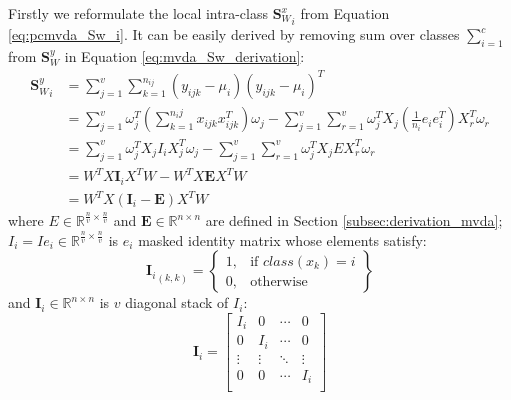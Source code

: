 \begin{appendix}
    Firstly we reformulate the local intra-class ${\boldsymbol{S}^x_W}_{i}$ from Equation \eqref{eq:pcmvda_Sw_i}.
    It can be easily derived by removing sum over classes $\sum_{i=1}^{c}$ from $\boldsymbol{S}_W^y$ in Equation \eqref{eq:mvda_Sw_derivation}:
    \begin{equation}
        \begin{split}
            {\boldsymbol{S}_W^y}_i &= \sum_{j=1}^{v}\sum_{k=1}^{n_{ij}}\left(y_{ijk}-\mu_i\right)\left(y_{ijk}-\mu_i\right)^T \\
            &= \sum_{j=1}^{v}\omega_j^T\left(\sum_{k=1}^{n_ij}x_{ijk}x_{ijk}^T\right)\omega_j - \sum_{j=1}^{v}\sum_{r=1}^{v}\omega_j^T X_j\left(\frac{1}{n_i} e_i e_i^T\right)X_r^T\omega_r \\
            &= \sum_{j=1}^{v}\omega_j^T X_j I_i X_j^T\omega_j - \sum_{j=1}^{v}\sum_{r=1}^{v}\omega_j^T X_j E X_r^T\omega_r \\
            &= W^T X \boldsymbol{I}_i X^T W - W^T X \boldsymbol{E} X^T W \\
            &= W^T X \left(\boldsymbol{I}_i - \boldsymbol{E}\right) X^T W
        \end{split}
        \label{eq:pcmvda_Sw_i_derivation}
    \end{equation}
    where $E \in \mathbb{R}^{\frac{n}{v}\times \frac{n}{v}}$ and $\boldsymbol{E} \in \mathbb{R}^{n\times n}$ are defined in Section \ref{subsec:derivation_mvda}; $I_{i} = I e_i \in \mathbb{R}^{\frac{n}{v}\times \frac{n}{v}}$ is $e_i$ masked identity matrix whose elements satisfy:
    \begin{equation}
        {\boldsymbol{I}_{i}}_{(k,k)} = \left\{\begin{array}{lr}
            1, & \text{if } class(x_k) = i \\
            0, & \text{otherwise}
            \end{array}\right\}
    \end{equation}
    and $\boldsymbol{I}_{i} \in \mathbb{R}^{n\times n}$ is $v$ diagonal stack of $I_i$:
    \begin{equation}
        \boldsymbol{I}_{i} = \left[\begin{matrix}I_i&0&\cdots&0\\0&I_i&\cdots&0\\\vdots&\vdots&\ddots&\vdots\\0&0&\cdots&I_i\\\end{matrix}\right]
    \end{equation}


\end{appendix}
